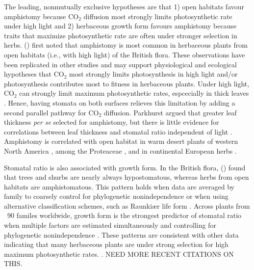 \documentclass[12pt, oneside]{article}
\begin{document}

The leading, nonmutually exclusive hypotheses are that 1) open habitats favour amphistomy because CO$_2$ diffusion most strongly limits photosynthetic rate under high light and 2) herbaceous growth form favours amphistomy because traits that maximize photosynthetic rate are often under stronger selection in herbs. \citeauthor{Salisbury_1927} (\citeyear{Salisbury_1927}) first noted that amphistomy is most common in herbaceous plants from open habitats (i.e., with high light) of the British flora. These observations have been replicated in other studies \citep{Mott_etal_1982, Peat_Fitter_1994b, Jordan_etal_2014, Muir_2015} and may support physiological and ecological hypotheses that CO$_2$ most strongly limits photosynthesis in high light and/or photosynthesis contributes most to fitness in herbaceous plants. Under high light, CO$_2$ can strongly limit maximum photosynthetic rates, espcecially in thick leaves \citep{Jones_1985}. Hence, having stomata on both surfaces relieves this limitation by adding a second parallel pathway for CO$_2$ diffusion. Parkhurst \citeyear{Parkhurst_1978} argued that greater leaf thickness \textit{per se} selected for amphistomy, but there is little evidence for correlations between leaf thickness and stomatal ratio independent of light \citep{Mott_etal_1982, Gibson_1996, Muir_2015}. Amphistomy is correlated with open habitat in warm desert plants of western North America \citep{Mott_etal_1982, Gibson_1996}, among the Proteaceae \citep{Jordan_etal_2014}, and in continental European herbs \citep{Bucher_etal_2017}.

Stomatal ratio is also associated with growth form. In the British flora, \citeauthor{Salisbury_1927} (\citeyear{Salisbury_1927}) found that trees and shurbs are nearly always hypostomatous, whereas herbs from open habitats are amphistomatous. This pattern holds when data are averaged by family to coarsely control for phylogenetic nonindependence \citep{Peat_Fitter_1994b} or when using alternative classification schemes, such as Raunki\ae r life form \citep{Peat_Fitter_1994b}. Across plants from ~90 familes worldwide, growth form is the strongest predictor of stomatal ratio when multiple factors are estimated simultaneously and controlling for phylogenetic nonindependence \citep{Muir_2015}. These patterns are consistent with other data indicating that many herbaceous plants are under strong selection for high maximum photosynthetic rates. \citep{Bazzaz_1979, Korner_etal_1989}. NEED MORE RECENT CITATIONS ON THIS.
\end{document}
